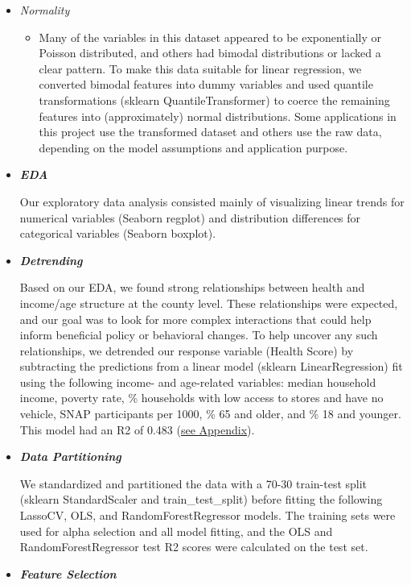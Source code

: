 \documentclass{article}
\begin{document}
\begin{itemize}[leftmargin=0pt]
\begin{itemize}
\item[] \textit{Normality}
\begin{itemize}
    \item[] Many of the variables in this dataset appeared to be exponentially or Poisson distributed, and others had bimodal distributions or lacked a clear pattern. To make this data suitable for linear regression, we converted bimodal features into dummy variables and used quantile transformations (sklearn QuantileTransformer) to coerce the remaining features into (approximately) normal distributions. Some applications in this project use the transformed dataset and others use the raw data, depending on the model assumptions and application purpose. 
\end{itemize}

\item[] \textbf{\textit{EDA}}

Our exploratory data analysis consisted mainly of visualizing linear trends for numerical variables (Seaborn regplot) and distribution differences for categorical variables (Seaborn boxplot). 

\item[] \textbf{\textit{Detrending}}

Based on our EDA, we found strong relationships between health and income/age structure at the county level. These relationships were expected, and our goal was to look for more complex interactions that could help inform beneficial policy or behavioral changes. To help uncover any such relationships, we detrended our response variable (Health Score) by subtracting the predictions from a linear model (sklearn LinearRegression) fit using the following income- and age-related variables: median household income, poverty rate, \% households with low access to stores and have no vehicle, SNAP participants per 1000, \% 65 and older, and \% 18 and younger. This model had an R2 of 0.483 (\hyperref[fig:detrend]{see Appendix}). 

\item[] \textbf{\textit{Data Partitioning}}

We standardized and partitioned the data with a 70-30 train-test split (sklearn StandardScaler and train\_test\_split) before fitting the following LassoCV, OLS, and RandomForestRegressor models. The training sets were used for alpha selection and all model fitting, and the OLS and RandomForestRegressor test R2 scores were calculated on the test set.

\item[] \textbf{\textit{Feature Selection}}


\end{itemize}
\end{itemize}
\end{document}
